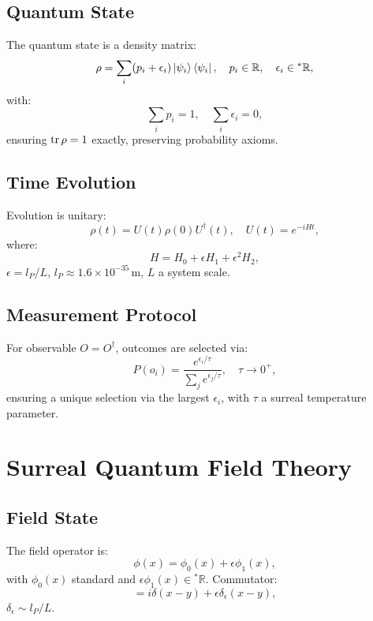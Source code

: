 \documentclass{article}
\begin{document}
\subsection{Quantum State}
The quantum state is a density matrix:
\begin{equation}
\rho = \sum_i (p_i + \epsilon_i) \ket{\psi_i}\bra{\psi_i}, \quad p_i \in \mathbb{R}, \quad \epsilon_i \in {}^*\mathbb{R},
\end{equation}
with:
\begin{equation}
\sum_i p_i = 1, \quad \sum_i \epsilon_i = 0,
\end{equation}
ensuring \(\tr \rho = 1\) exactly, preserving probability axioms.

\subsection{Time Evolution}
Evolution is unitary:
\begin{equation}
\rho(t) = U(t) \rho(0) U^\dagger(t), \quad U(t) = e^{-i H t},
\end{equation}
where:
\begin{equation}
H = H_0 + \epsilon H_1 + \epsilon^2 H_2,
\end{equation}
\(\epsilon = l_P / L\), \(l_P \approx 1.6 \times 10^{-35} \, \text{m}\), \(L\) a system scale.

\subsection{Measurement Protocol}
For observable \(O = O^\dagger\), outcomes are selected via:
\begin{equation}
P(o_i) = \frac{e^{\epsilon_i / \tau}}{\sum_j e^{\epsilon_j / \tau}}, \quad \tau \to 0^+,
\end{equation}
ensuring a unique selection via the largest \(\epsilon_i\), with \(\tau\) a surreal temperature parameter.

\section{Surreal Quantum Field Theory}
\subsection{Field State}
The field operator is:
\begin{equation}
\phi(x) = \phi_0(x) + \epsilon \phi_1(x),
\end{equation}
with \(\phi_0(x)\) standard and \(\epsilon \phi_1(x) \in {}^*\mathbb{R}\). Commutator:
\begin{equation}
[\phi(x), \pi(y)] = i \delta(x-y) + \epsilon \delta_\epsilon(x-y),
\end{equation}
\(\delta_\epsilon \sim l_P / L\).
\end{document}
